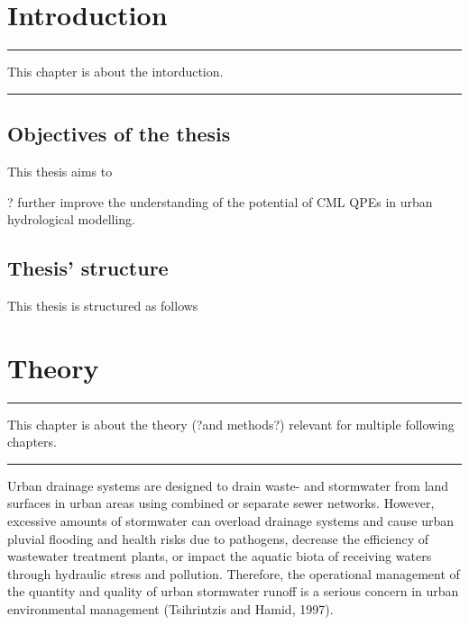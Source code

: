 \documentclass{ctuthesis}\usepackage[]{graphicx}\usepackage[]{color}
\begin{document}
        \maketitle
        


\chapter{Introduction} \label{chap1}

\rule{\textwidth}{0.4pt}
This chapter is about the intorduction. \newline
\rule[0.2cm]{\textwidth}{0.4pt}



\section{Objectives of the thesis}

This thesis aims to 

? further improve the understanding of the potential of CML QPEs in urban hydrological modelling.


\section{Thesis' structure}

This thesis is structured as follows

        


\chapter{Theory} \label{chap2}

\rule{\textwidth}{0.4pt}
This chapter is about the theory (?and methods?) relevant for multiple following chapters. \newline
\rule[0.2cm]{\textwidth}{0.4pt}


Urban drainage systems are designed to drain waste- and stormwater from land surfaces in urban areas using combined or separate sewer networks. However, excessive amounts of stormwater can overload drainage systems and cause urban pluvial flooding and health risks due to pathogens, decrease the efficiency of wastewater treatment plants, or impact the aquatic biota of receiving waters through hydraulic stress and pollution. Therefore, the operational management of the quantity and quality of urban stormwater runoff is a serious concern in urban environmental management (Tsihrintzis and Hamid, 1997).
\end{document}
